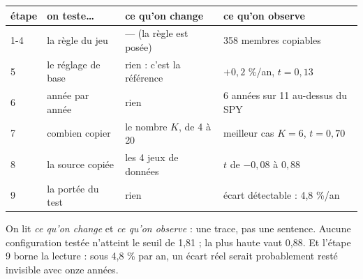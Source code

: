 \documentclass[10pt,a4paper]{article}
\begin{document}
\begin{tcolorbox}[enhanced, colback=white, colframe=grisc, boxrule=0.5pt, arc=2pt,
                  left=3mm, right=3mm, top=1.6mm, bottom=1.6mm,
                  colbacktitle=grisf, coltitle=white, fonttitle=\footnotesize\bfseries,
                  title={LA TRACE --- ce qu'on a changé, ce qu'on a observé}]
\begin{center}\footnotesize
\begin{tabular}{@{}llll@{}}
\toprule
étape & on teste\ldots & ce qu'on change & ce qu'on observe \\
\midrule
1-4 & la règle du jeu & --- (la règle est posée) & 358 membres copiables \\
5 & le réglage de base & rien : c'est la référence & $+0{,}2$ \%/an, $t = 0{,}13$ \\
6 & année par année & rien & 6 années sur 11 au-dessus du SPY \\
7 & combien copier & le nombre $K$, de 4 à 20 & meilleur cas $K = 6$, $t = 0{,}70$ \\
8 & la source copiée & les 4 jeux de données & $t$ de $-0{,}08$ à $0{,}88$ \\
9 & la portée du test & rien & écart détectable : 4,8 \%/an \\
\bottomrule
\end{tabular}
\end{center}
\vspace{0.6mm}
{\footnotesize On lit \emph{ce qu'on change} et \emph{ce qu'on observe} : une trace, pas une sentence.
Aucune configuration testée n'atteint le seuil de 1,81 ; la plus haute vaut 0,88. Et l'étape 9 borne la
lecture : sous 4,8 \% par an, un écart réel serait probablement resté invisible avec onze années.}
\end{tcolorbox}
\end{document}
